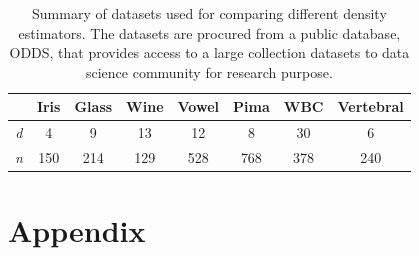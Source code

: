 \documentclass{article}
\begin{document}
\begin{table}
\centering
\caption{Summary of datasets used for comparing different density estimators. The datasets are procured from a public database, ODDS, that provides access to a large collection datasets to data science community for research purpose.}
\begin{tabular}{| c | c c c c c c c|}
\hline
& Iris & Glass  & Wine  & Vowel & Pima  & WBC  & Vertebral  \\
\hline
\textit{d} & 4                    & 9     & 13          & 12       & 8         & 30   & 6 \\
 \textit{n} & 150                & 214   & 129     & 528    & 768    & 378  & 240 \\
\hline
\end{tabular}
\label{tab:public_datasets}
\end{table} 

\section*{\refname}








 






\newpage

\appendix

\onecolumn

\section{Appendix} 
\end{document}
